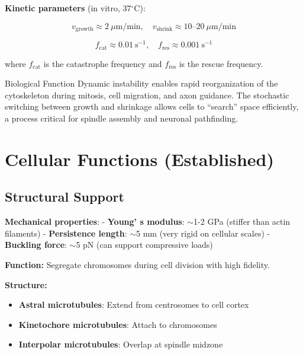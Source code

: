 \textbf{Kinetic parameters} (in vitro, 37$^\circ$C):

\begin{equation}
v_{\text{growth}} \approx 2~\mu\text{m/min}, \quad v_{\text{shrink}} \approx 10\text{--}20~\mu\text{m/min}
\label{eq:growth-shrink-rates}
\end{equation}

\begin{equation}
f_{\text{cat}} \approx 0.01~\text{s}^{-1}, \quad f_{\text{res}} \approx 0.001~\text{s}^{-1}
\label{eq:catastrophe-rescue-freq}
\end{equation}

where $f_{\text{cat}}$ is the catastrophe frequency and $f_{\text{res}}$ is the rescue frequency.

\begin{calloutbox}{Biological Function}
Dynamic instability enables rapid reorganization of the cytoskeleton during mitosis, cell migration, and axon guidance. The stochastic switching between growth and shrinkage allows cells to ``search'' space efficiently, a process critical for spindle assembly and neuronal pathfinding.
\end{calloutbox}

\section{Cellular Functions (Established)}
\label{sec:cellular-functions}

\subsection{Structural Support}\label{structural-support}

\textbf{Mechanical properties}: - \textbf{Young' s
modulus}: $\sim$1-2 GPa (stiffer than actin filaments) -
\textbf{Persistence length}: $\sim$5 mm (very rigid on cellular
scales) - \textbf{Buckling force}: $\sim$5 pN (can support
compressive loads)

\textbf{Function:} Segregate chromosomes during cell division with high fidelity.

\textbf{Structure:}
\begin{itemize}
\item \textbf{Astral microtubules}: Extend from centrosomes to cell cortex
\item \textbf{Kinetochore microtubules}: Attach to chromosomes
\item \textbf{Interpolar microtubules}: Overlap at spindle midzone
\end{itemize}

